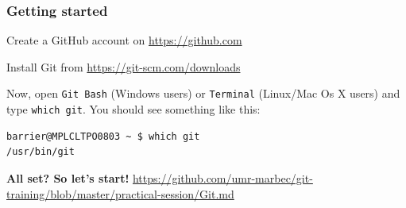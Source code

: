 \documentclass[svgnames]{beamer}
\begin{document}
%
%
%
%
%
%

\begin{frame}[fragile]
\frametitle{Getting started}

Create a GitHub account on \url{https://github.com}\\
\hfill

Install Git from \url{https://git-scm.com/downloads}\\
\hfill




Now, open \verb+Git Bash+ (Windows users) or \verb+Terminal+ (Linux/Mac Os X users) and type \verb+which git+. You should see something like this:

\begin{verbatim}
barrier@MPLCLTPO0803 ~ $ which git
/usr/bin/git
\end{verbatim}

\textbf{All set? So let's start!}
\url{https://github.com/umr-marbec/git-training/blob/master/practical-session/Git.md}

\end{frame}
\end{document}
